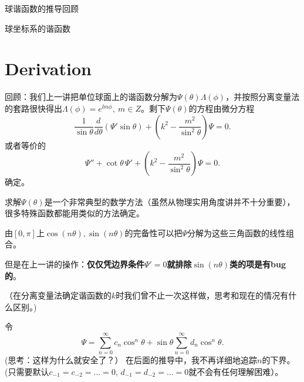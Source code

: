 \documentclass[CJK]{beamer}
\date{}
\begin{document}

\begin{frame}
\bch
\bitem
\item{球谐函数的推导回顾}
\item{球坐标系的谐函数}
\eitem
\ech
\end{frame}


\section{Derivation}

\begin{frame}
  \bch
  回顾：我们上一讲把单位球面上的谐函数分解为$\Psi(\theta)\Lambda(\phi)$，并按照分离变量法的套路很快得出$\Lambda(\phi) = e^{\ii m\phi}, \ m\in Z$。剩下$\Psi(\theta)$的方程由微分方程
  $$ \frac{1}{\sin\theta}\frac{d}{d\theta}\left(\Psi'\sin\theta \right) +\left(k^2-\frac{m^2}{\sin^2\theta}\right) \Psi = 0. $$
  或者等价的
  $$ \Psi''+\cot\theta \,\Psi' +\left(k^2-\frac{m^2}{\sin^2\theta}\right) \Psi = 0. $$
  确定。

  \skipline
  
  求解$\Psi(\theta)$是一个非常典型的数学方法（虽然从物理实用角度讲并不十分重要），很多特殊函数都能用类似的方法确定。
  
  \ech
\end{frame}


\begin{frame}
  \bch
  由$[0,\pi]$上$\cos{(n\theta)}, \sin{(n\theta)}$的完备性可以把$\Psi$分解为这些三角函数的线性组合。

  \skipline
  
  但是在上一讲的操作：{\bf 仅仅凭边界条件$\Psi' = 0$就排除$\sin{(n\theta)}$类的项是有bug的}。

  \skipline
  
  （在分离变量法确定谐函数的$k$时我们曾不止一次这样做，思考和现在的情况有什么区别。)

  
  \ech
\end{frame}


\begin{frame}
  \bch
  令
  $$ \Psi = \sum_{n=0}^\infty c_n\cos^n\theta + \sin\theta \sum_{n=0}^\infty d_n\cos^n\theta. $$
  (思考：这样为什么就安全了？）
  在后面的推导中，我不再详细地追踪$n$的下界。(只需要默认$c_{-1}=c_{-2}=\ldots =0 $, $d_{-1}=d_{-2}=\ldots = 0$就不会有任何理解困难）。
  \ech
\end{frame}
\end{document}
